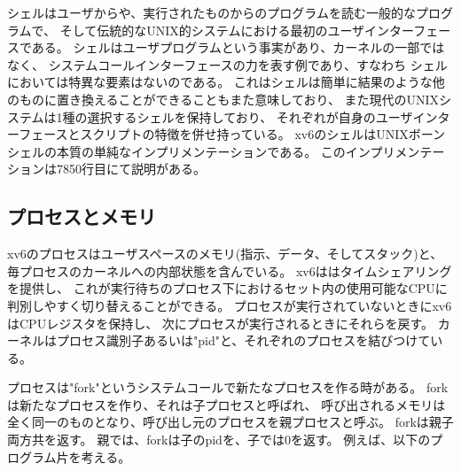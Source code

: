 \documentclass[11pt,a4paper, uplatex]{jsarticle}
\begin{document}
シェルはユーザからや、実行されたものからのプログラムを読む一般的なプログラムで、
そして伝統的なUNIX的システムにおける最初のユーザインターフェースである。
シェルはユーザプログラムという事実があり、カーネルの一部ではなく、
システムコールインターフェースの力を表す例であり、すなわち
シェルにおいては特異な要素はないのである。
これはシェルは簡単に結果のような他のものに置き換えることができることもまた意味しており、
また現代のUNIXシステムは1種の選択するシェルを保持しており、
それぞれが自身のユーザインターフェースとスクリプトの特徴を併せ持っている。
xv6のシェルはUNIXボーンシェルの本質の単純なインプリメンテーションである。
このインプリメンテーションは7850行目にて説明がある。

\subsection{プロセスとメモリ}
xv6のプロセスはユーザスペースのメモリ(指示、データ、そしてスタック)と、
毎プロセスのカーネルへの内部状態を含んでいる。
xv6ははタイムシェアリングを提供し、
これが実行待ちのプロセス下におけるセット内の使用可能なCPUに判別しやすく切り替えることができる。
プロセスが実行されていないときにxv6はCPUレジスタを保持し、
次にプロセスが実行されるときにそれらを戻す。
カーネルはプロセス識別子あるいは"pid"と、それぞれのプロセスを結びつけている。

プロセスは"fork"というシステムコールで新たなプロセスを作る時がある。
forkは新たなプロセスを作り、それは子プロセスと呼ばれ、
呼び出されるメモリは全く同一のものとなり、呼び出し元のプロセスを親プロセスと呼ぶ。
forkは親子両方共を返す。
親では、forkは子のpidを、子では0を返す。
例えば、以下のプログラム片を考える。


%
%
\end{document}
